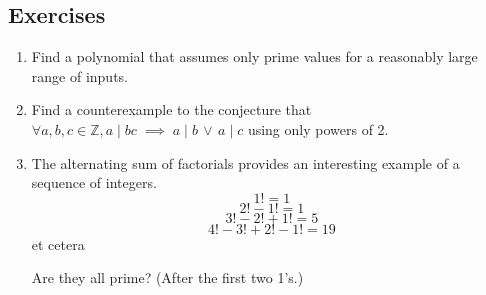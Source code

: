 \documentclass[10pt,]{book}
\theoremstyle{plain}
\theoremstyle{definition}
\theoremstyle{definition}
\numberwithin{equation}{section}
\newcommand{\hint}[1]{ }
\newcommand{\divides}{\!\mid\!}
\newcommand{\Integers}{{\mathbb Z}}
\begin{document}
\subsection[{Exercises}]{Exercises}\label{exercises-18}
\leavevmode%
\begin{enumerate}[label=(\alph*)]
\item\hypertarget{li-262}{}
          Find a polynomial that assumes only prime values for
          a reasonably large range of inputs.

          \hint{It sort of depends on what is meant by ``a reasonably large range of inputs.''  For example the polynomial \(p(x) = 2x+1\) gives primes three times in a row (at \(x=1,2\) and \(3\)).  See if you can do better than that.
          }
\item\hypertarget{li-263}{}
          Find a counterexample to the conjecture that \(\forall a,b,c \in \Integers, a \divides bc \; \implies \; a \divides b \, \lor \, a \divides c\)  using only powers of 2.

          \hint{The intent of the problem is that you find three numbers, \(a\), \(b\) and \(c\), that are all powers 
          of \(2\) and such that \(a\) divides the product \(bc\), but neither of the factors separately. For instance, 
          if you pick \(a=16\), then you would need to choose \(b\) and \(c\) so that \(16\) doesn't divide evenly 
          into them (they would need to be less than \(16\)\dots{}) but so that their product \emph{is} divisible by \(16\).
          }
\item\hypertarget{li-264}{}
          The alternating sum of factorials provides an interesting
          example of a sequence of integers.
          \begin{equation*}
            1! = 1
          \end{equation*}
          \begin{equation*}
            2! - 1! = 1
          \end{equation*}
          \begin{equation*}
            3! - 2! + 1! = 5
          \end{equation*}
          \begin{equation*}
            4! - 3! + 2! - 1! = 19
          \end{equation*}
          et cetera 

           Are they all prime?  (After the first two 1's.)

          \hint{

}
\end{enumerate}
\end{document}
